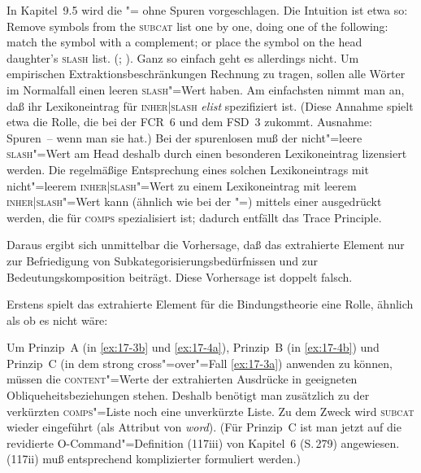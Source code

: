 \documentclass[output=paper]{LSP/langsci}
\begin{document}
\randnum\label{rn:17-26} 
In Kapitel~9.5 wird die "= ohne Spuren vorgeschlagen. Die Intuition ist etwa so: {\glqq}Remove symbols from the \textsc{subcat} list one by one, doing one of the following: match the symbol with a complement; or place the symbol on the head daughter's \textsc{slash} list.{\grqq} (\citealt[256]{pollard1985a}; \citealt[402]{pollard1988a}). Ganz so einfach geht es allerdings nicht. Um empirischen Extraktionsbeschränkungen Rechnung zu tragen, sollen alle Wörter im Normalfall einen leeren \textsc{slash}"=Wert haben. Am einfachsten nimmt man an, daß ihr Lexikoneintrag für \textsc{inher}|\textsc{slash} \textit{elist} spezifiziert ist. (Diese Annahme spielt etwa die Rolle, die bei \citet{gazdaretal1985a} der FCR~6 und dem FSD~3 zukommt. Ausnahme: Spuren~-- wenn man sie hat.) Bei der spurenlosen  muß der nicht"=leere \textsc{slash}"=Wert am Head deshalb durch einen besonderen Lexikoneintrag lizensiert werden. Die regelmäßige Entsprechung eines solchen Lexikoneintrags mit nicht"=leerem \textsc{inher|slash}"=Wert zu einem Lexikoneintrag mit leerem \textsc{inher|slash}"=Wert kann (ähnlich wie bei der "=) mittels einer  ausgedrückt werden, die für \textsc{comps} spezialisiert ist; dadurch entfällt das Trace Principle.

\randnum\label{rn:17-27}Daraus ergibt sich unmittelbar die Vorhersage, daß das extrahierte
Element nur zur Befriedigung von Subkategorisierungsbedürfnissen und
zur Bedeutungskomposition beiträgt. Diese Vorhersage ist doppelt
falsch.

\randnum\label{rn:17-28}Erstens spielt das extrahierte Element für die Bindungstheorie eine
Rolle, ähnlich als ob es nicht  wäre:
\begin{exe}
\ex
\label{ex:17-3}
\begin{xlist}
\end{xlist}
\ex
\label{ex:17-4}
\begin{xlist}
\end{xlist}
\end{exe}
\addlines
Um Prinzip~A (in \eqref{ex:17-3b} und \eqref{ex:17-4a}), Prinzip~B (in \eqref{ex:17-4b}) und Prinzip~C (in
dem strong cross"=over"=Fall \eqref{ex:17-3a}) anwenden zu können, müssen die
\textsc{content}"=Werte der extrahierten Ausdrücke in geeigneten
Obliqueheitsbeziehungen stehen. Deshalb benötigt man zusätzlich zu der
verkürzten \textsc{comps}"=Liste noch eine unverkürzte Liste. Zu dem
Zweck wird \textsc{subcat} wieder eingeführt (als Attribut von
\textit{word}). (Für Prinzip~C ist man jetzt auf die revidierte
O-Command"=Definition (117iii) von Kapitel~6 (S.\,279)
angewiesen. (117ii) muß entsprechend komplizierter formuliert werden.)
\end{document}

